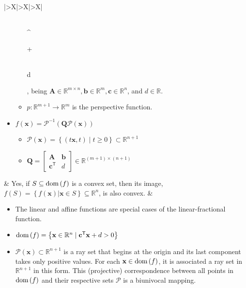 \documentclass{article}
\newcommand{\dom}[1]{\ensuremath{\textnormal{dom}\left(#1\right)}} %
\begin{document}
\begin{table}[H]
\begin{tabularx}{\textwidth}{|>{\setlength\hsize{1\hsize}\setlength\linewidth{\hsize}}X|>{\setlength\hsize{.9\hsize}\setlength\linewidth{\hsize}}X|>{\setlength\hsize{1.1\hsize}\setlength\linewidth{\hsize}}X|}
\begin{itemize}[leftmargin=*]
\begin{itemize}[label={$\triangleright$}]
\begin{bmatrix}
                    \\
                    ^
                \end{bmatrix}  + \begin{bmatrix}
                     \\
                    d
                \end{bmatrix}\), being \(\mathbf{A}\in \mathbb{R}^{m \times n}, \mathbf{b} \in \mathbb{R}^{m}, \mathbf{c} \in \mathbb{R}^{n}\), and \(d \in \mathbb{R}\).
                \item \(p: \mathbb{R}^{m+1} \rightarrow \mathbb{R}^{m}\) is the perspective function.
            \end{itemize}
        \item \(f(\mathbf{x}) = \mathcal{P}^{-1}(\mathbf{Q}\mathcal{P}(\mathbf{x}))\)
            \begin{itemize}[label={$\triangleright$}]
                \item \(\mathcal{P}(\mathbf{x}) = \left\{ (t\mathbf{x}, t) \mid t \geq 0 \right\} \subset \mathbb{R}^{n+1}\)
                \item \(\mathbf{Q} = \begin{bmatrix}
                    \mathbf{A} & \mathbf{b} \\
                    \mathbf{c}^\mathsf{T} & d
                \end{bmatrix} \in \mathbb{R}^{(m+1)\times(n+1)}\)
            \end{itemize}
    \end{itemize} & Yes, if \(S \subseteq \dom{f}\) is a convex set, then its image, \(f(S) = \left\{ f(\mathbf{x})|\mathbf{x}\in S \right\} \subseteq \mathbb{R}^{n}\), is also convex. & \vspace{-3.5ex} \begin{itemize}[leftmargin=*]
        \item The linear and affine functions are special cases of the linear-fractional function.
        \item \(\dom{f} = \left\{ \mathbf{x} \in \mathbb{R}^{n} \mid \mathbf{c}^\mathsf{T} \mathbf{x} + d > 0 \right\}\)
        \item \(\mathcal{P}(\mathbf{x}) \subset \mathbb{R}^{n+1}\) is a ray set that begins at the origin and its last component takes only positive values. For each \(\mathbf{x} \in \dom{f}\), it is associated a ray set in \(\mathbb{R}^{n+1}\) in this form. This (projective) correspondence between all points in \(\dom{f}\) and their respective sets \(\mathcal{P}\) is a biunivocal mapping.

\end{itemize}
\end{tabularx}
\end{table}
\end{document}
